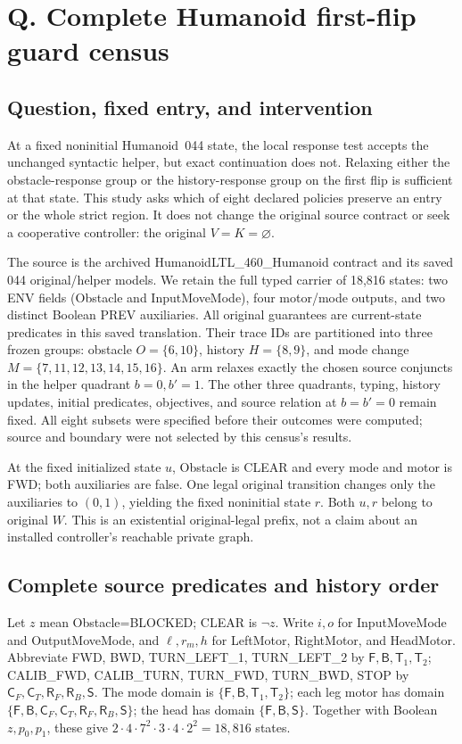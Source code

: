 \section*{Q. Complete Humanoid first-flip guard census}
\setcounter{subsection}{0}
\renewcommand{\thesubsection}{Q.\arabic{subsection}}
\renewcommand{\theHsubsection}{Q.\arabic{subsection}}

\subsection{Question, fixed entry, and intervention}
At a fixed noninitial Humanoid~044 state, the local response test
accepts the unchanged syntactic helper, but exact continuation does
not. Relaxing either the obstacle-response group or the history-response
group on the first flip is sufficient at that state. This study asks
which of eight declared policies preserve an entry or the whole strict
region. It does not change the original source contract or seek a
cooperative controller: the original $V=K=\varnothing$.

The source is the archived HumanoidLTL\_460\_Humanoid contract and its
saved 044 original/helper models. We retain the full typed carrier
of 18,816 states: two ENV fields (Obstacle and InputMoveMode), four
motor/mode outputs, and two distinct Boolean PREV auxiliaries. All
original guarantees are current-state predicates in this saved
translation. Their trace IDs are partitioned into three frozen groups:
obstacle $O=\{6,10\}$, history $H=\{8,9\}$, and mode change
$M=\{7,11,12,13,14,15,16\}$. An arm relaxes exactly the chosen source
conjuncts in the helper quadrant $b=0,b'=1$. The other three quadrants,
typing, history updates, initial predicates, objectives, and source
relation at $b=b'=0$ remain fixed. All eight subsets were specified
before their outcomes were computed; source and boundary were not
selected by this census's results.

At the fixed initialized state $u$, Obstacle is CLEAR and every mode
and motor is FWD; both auxiliaries are false. One legal original
transition changes only the auxiliaries to $(0,1)$, yielding the fixed
noninitial state $r$. Both $u,r$ belong to original $W$. This is an
existential original-legal prefix, not a claim about an installed
controller's reachable private graph.

\subsection{Complete source predicates and history order}
Let $z$ mean Obstacle=BLOCKED; CLEAR is $\neg z$. Write $i,o$ for
InputMoveMode and OutputMoveMode, and $\ell,r_m,h$ for LeftMotor,
RightMotor, and HeadMotor. Abbreviate FWD, BWD, TURN\_LEFT\_1,
TURN\_LEFT\_2 by $\mathsf F,\mathsf B,\mathsf T_1,\mathsf T_2$;
CALIB\_FWD, CALIB\_TURN, TURN\_FWD, TURN\_BWD, STOP by
$\mathsf C_F,\mathsf C_T,\mathsf R_F,\mathsf R_B,\mathsf S$.
The mode domain is $\{\mathsf F,\mathsf B,\mathsf T_1,\mathsf T_2\}$;
each leg motor has domain
$\{\mathsf F,\mathsf B,\mathsf C_F,\mathsf C_T,\mathsf R_F,\mathsf R_B,\mathsf S\}$;
the head has domain $\{\mathsf F,\mathsf B,\mathsf S\}$.
Together with Boolean $z,p_0,p_1$, these give
$2\cdot4\cdot7^2\cdot3\cdot4\cdot2^2=18,816$ states.

